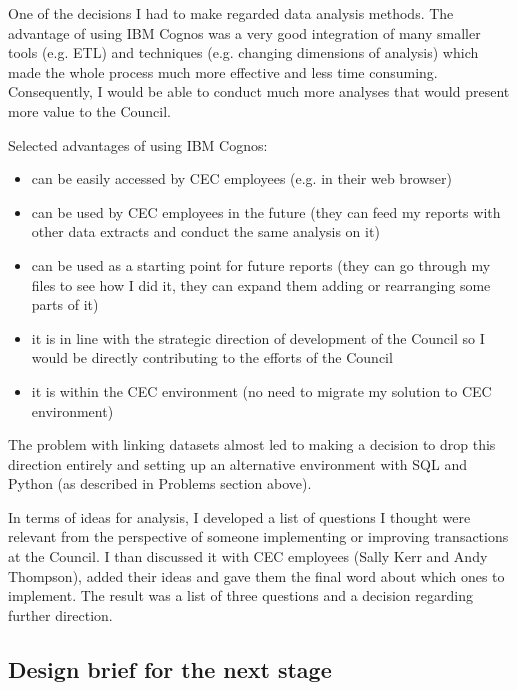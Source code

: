 One of the decisions I had to make regarded data analysis methods. The advantage of using IBM Cognos was a very good integration of many smaller tools (e.g. ETL) and techniques (e.g. changing dimensions of analysis) which made the whole process much more effective and less time consuming. Consequently, I would be able to conduct much more analyses that would present more value to the Council.

Selected advantages of using IBM Cognos:
\begin{itemize}
\item can be easily accessed by CEC employees (e.g. in their web browser)
\item can be used by CEC employees in the future (they can feed my reports with other data extracts and conduct the same analysis on it)
\item can be used as a starting point for future reports (they can go through my files to see how I did it, they can expand them adding or rearranging some parts of it)
\item it is in line with the strategic direction of development of the Council so I would be directly contributing to the efforts of the Council
\item it is within the CEC environment (no need to migrate my solution to CEC environment)
\end{itemize}

The problem with linking datasets almost led to making a decision to drop this direction entirely and setting up an alternative environment with SQL and Python (as described in Problems section above).

In terms of ideas for analysis, I developed a list of questions I thought were relevant from the perspective of someone implementing or improving transactions at the Council. I than discussed it with CEC employees (Sally Kerr and Andy Thompson), added their ideas and gave them the final word about which ones to implement. The result was a list of three questions and a decision regarding further direction.
		
		\subsection{Design brief for the next stage}
		
